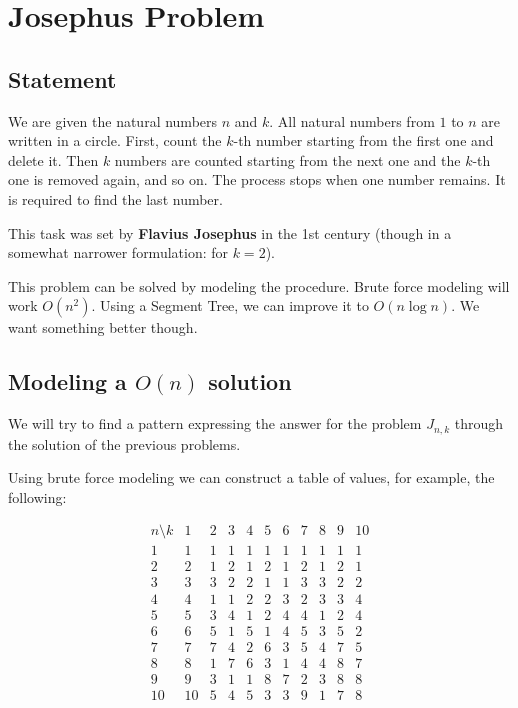 \section{Josephus Problem}

\subsection{Statement}

We are given the natural numbers $n$ and $k$.
All natural numbers from $1$ to $n$ are written in a circle. 
First, count the $k$-th number starting from the first one and delete it.
Then $k$ numbers are counted starting from the next one and the $k$-th one is removed again, and so on.
The process stops when one number remains.
It is required to find the last number.

This task was set by \textbf{Flavius Josephus} in the 1st century (though in a somewhat narrower formulation: for $k = 2$).

This problem can be solved by modeling the procedure.
Brute force modeling will work $O(n^{2})$. Using a Segment Tree, we can improve it to $O(n \log n)$.
We want something better though.

\subsection{Modeling a $O(n)$ solution}

We will try to find a pattern expressing the answer for the problem $J_{n, k}$ through the solution of the previous problems.

Using brute force modeling we can construct a table of values, for example, the following:

$$\begin{array}{ccccccccccc}
n\setminus k & 1 & 2 & 3 & 4 & 5 & 6 & 7 & 8 & 9 & 10 \\
1 & 1 & 1 & 1 & 1 & 1 & 1 & 1 & 1 & 1 & 1 \\
2 & 2 & 1 & 2 & 1 & 2 & 1 & 2 & 1 & 2 & 1 \\
3 & 3 & 3 & 2 & 2 & 1 & 1 & 3 & 3 & 2 & 2 \\
4 & 4 & 1 & 1 & 2 & 2 & 3 & 2 & 3 & 3 & 4 \\
5 & 5 & 3 & 4 & 1 & 2 & 4 & 4 & 1 & 2 & 4 \\
6 & 6 & 5 & 1 & 5 & 1 & 4 & 5 & 3 & 5 & 2 \\
7 & 7 & 7 & 4 & 2 & 6 & 3 & 5 & 4 & 7 & 5 \\
8 & 8 & 1 & 7 & 6 & 3 & 1 & 4 & 4 & 8 & 7 \\
9 & 9 & 3 & 1 & 1 & 8 & 7 & 2 & 3 & 8 & 8 \\
10 & 10 & 5 & 4 & 5 & 3 & 3 & 9 & 1 & 7 & 8 \\
\end{array}$$

